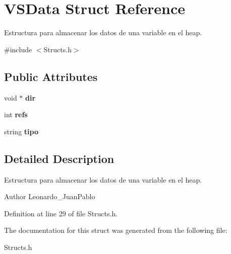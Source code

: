\hypertarget{struct_v_s_data}{}\section{V\+S\+Data Struct Reference}
\label{struct_v_s_data}


Estructura para almacenar los datos de una variable en el heap.  




{\ttfamily \#include $<$Structs.\+h$>$}

\subsection*{Public Attributes}
\begin{DoxyCompactItemize}
\item 
\mbox{\label{struct_v_s_data_a21fadf74b49ead789b734cf17cdd4f26}} 
void $\ast$ {\bfseries dir}
\item 
\mbox{\label{struct_v_s_data_aa9d539fc25deed183ae7bf75a18f5db1}} 
int {\bfseries refs}
\item 
\mbox{\label{struct_v_s_data_aab5cf4a7b54ff520b6569109953d385b}} 
string {\bfseries tipo}
\end{DoxyCompactItemize}


\subsection{Detailed Description}
Estructura para almacenar los datos de una variable en el heap. 

\begin{DoxyAuthor}{Author}
Leonardo\+\_\+\+Juan\+Pablo 
\end{DoxyAuthor}


Definition at line 29 of file Structs.\+h.



The documentation for this struct was generated from the following file\+:\begin{DoxyCompactItemize}
\item 
Structs.\+h\end{DoxyCompactItemize}
